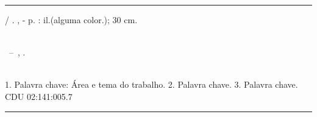 
\begin{fichacatalografica}
\vspace*{15cm} %
\hrule %
\begin{center} %
\begin{minipage}[c]{12.5cm} %
\imprimirautor
\hspace{0.5cm} \imprimirtitulo / \imprimirautor. 
\imprimirlocal, \imprimirdata-
\hspace{0.5cm} \pageref{LastPage} p. : il.(alguma color.); 30 cm.\\
\hspace{0.5cm} \imprimirorientadorRotulo \; \imprimirorientador\\
\hspace{0.5cm}
\parbox[t]{\textwidth}{\imprimirtipotrabalho~--~\imprimirinstituicao,
\imprimirdata.}\\
\hspace{0.5cm}
1. Palavra chave: Área e tema do trabalho.
2. Palavra chave.
3. Palavra chave.
\hspace{8.75cm} CDU 02:141:005.7\\
\end{minipage}
\end{center}
\hrule
\end{fichacatalografica}
